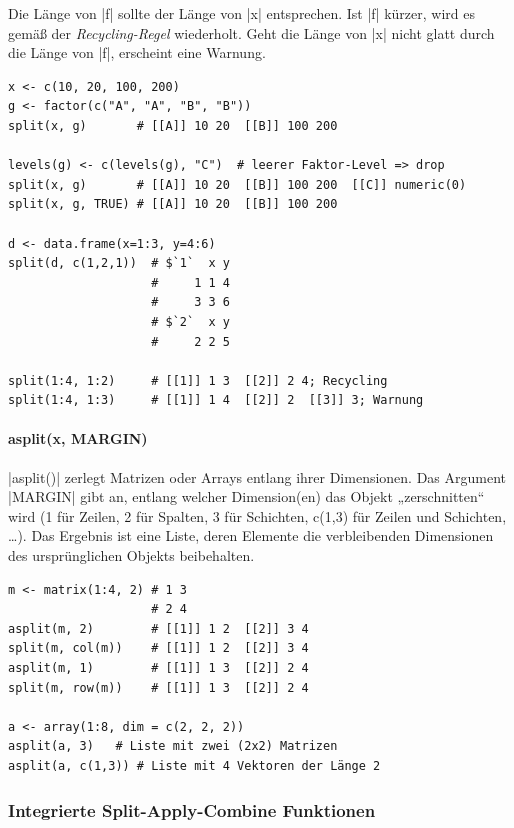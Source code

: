 \documentclass[10pt,twocolumn]{scrartcl}
\renewcommand{\lstinline}{\mycoloredinline}
\begin{document}
Die Länge von \lstinline|f| sollte der Länge von \lstinline|x| entsprechen. Ist \lstinline|f| kürzer, wird es gemäß der \emph{Recycling-Regel} wiederholt. Geht die Länge von \lstinline|x| nicht glatt durch die Länge von \lstinline|f|, erscheint eine Warnung.

\begin{lstlisting}
x <- c(10, 20, 100, 200)
g <- factor(c("A", "A", "B", "B"))
split(x, g)       # [[A]] 10 20  [[B]] 100 200

levels(g) <- c(levels(g), "C")  # leerer Faktor-Level => drop
split(x, g)       # [[A]] 10 20  [[B]] 100 200  [[C]] numeric(0)
split(x, g, TRUE) # [[A]] 10 20  [[B]] 100 200

d <- data.frame(x=1:3, y=4:6)
split(d, c(1,2,1))  # $`1`  x y
                    #     1 1 4
                    #     3 3 6
                    # $`2`  x y
                    #     2 2 5

split(1:4, 1:2)     # [[1]] 1 3  [[2]] 2 4; Recycling
split(1:4, 1:3)     # [[1]] 1 4  [[2]] 2  [[3]] 3; Warnung
\end{lstlisting}


\paragraph{asplit(x, MARGIN)}

\lstinline|asplit()| zerlegt Matrizen oder Arrays entlang ihrer Dimensionen. Das Argument \lstinline|MARGIN| gibt an, entlang welcher Dimension(en) das Objekt „zerschnitten“ wird (1 für Zeilen, 2 für Spalten, 3 für Schichten, c(1,3) für Zeilen und Schichten, \dots). Das Ergebnis ist eine Liste, deren Elemente die verbleibenden Dimensionen des ursprünglichen Objekts beibehalten.

\begin{lstlisting}
m <- matrix(1:4, 2) # 1 3
                    # 2 4
asplit(m, 2)        # [[1]] 1 2  [[2]] 3 4
split(m, col(m))    # [[1]] 1 2  [[2]] 3 4
asplit(m, 1)        # [[1]] 1 3  [[2]] 2 4
split(m, row(m))    # [[1]] 1 3  [[2]] 2 4

a <- array(1:8, dim = c(2, 2, 2))
asplit(a, 3)   # Liste mit zwei (2x2) Matrizen
asplit(a, c(1,3)) # Liste mit 4 Vektoren der Länge 2
\end{lstlisting}


\subsubsection{Integrierte Split-Apply-Combine Funktionen}
\end{document}

